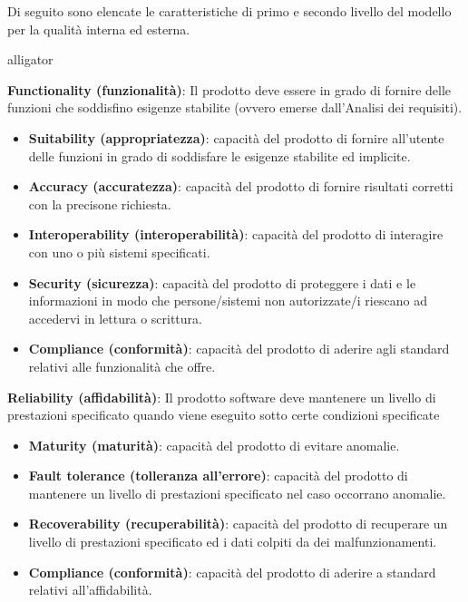 Di seguito sono elencate le caratteristiche di primo e secondo livello del modello per la qualità interna ed esterna.
\begin{labeling}{alligator}
	\item \textbf{Functionality (funzionalità)}: Il prodotto deve essere in grado di fornire delle funzioni che soddisfino esigenze stabilite (ovvero emerse dall'Analisi dei requisiti).
	\begin{itemize}
		\item \textbf{Suitability (appropriatezza)}: capacità del prodotto di fornire all'utente delle funzioni in grado di soddisfare le esigenze stabilite ed implicite. 
		
		\item \textbf{Accuracy (accuratezza)}: capacità del prodotto di fornire risultati corretti con la precisone richiesta. 
		
		\item \textbf{Interoperability (interoperabilità)}: capacità del prodotto di interagire con uno o più sistemi specificati. 
		
		\item \textbf{Security (sicurezza)}: capacità del prodotto di proteggere i dati e le informazioni in modo che persone/sistemi non autorizzate/i riescano ad accedervi in lettura o scrittura.
		
		\item \textbf{Compliance (conformità)}: capacità del prodotto di aderire agli standard relativi alle funzionalità che offre.
	\end{itemize}
	\item \textbf{Reliability (affidabilità)}: Il prodotto software deve mantenere un livello di prestazioni specificato quando viene eseguito sotto certe condizioni specificate
	\begin{itemize}
		\item \textbf{Maturity (maturità)}: capacità del prodotto di evitare anomalie.
		
		\item \textbf{Fault tolerance (tolleranza all'errore)}: capacità del prodotto di mantenere un livello di prestazioni specificato nel caso occorrano anomalie.
		
		\item \textbf{Recoverability (recuperabilità)}: capacità del prodotto di recuperare un livello di prestazioni specificato ed i dati colpiti da dei malfunzionamenti.
		
		\item \textbf{Compliance (conformità)}: capacità del prodotto di aderire a standard relativi all'affidabilità.
	\end{itemize}
	

\end{labeling}
